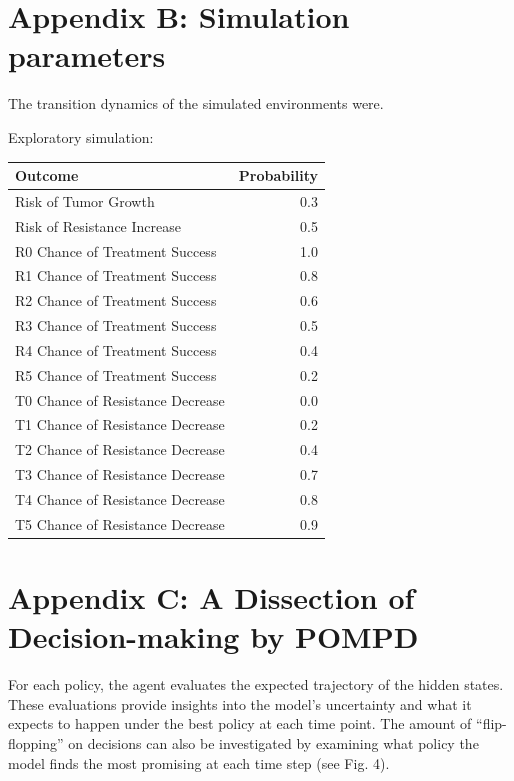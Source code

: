 \documentclass[
]{article}
\begin{document}
\section{Appendix B: Simulation
parameters}\label{appendix-b-simulation-parameters}

The transition dynamics of the simulated environments were.

Exploratory simulation:

\begin{longtable}[]{@{}lr@{}}
\toprule\noalign{}
Outcome & Probability \\
\midrule\noalign{}
\endhead
\bottomrule\noalign{}
\endlastfoot
Risk of Tumor Growth & 0.3 \\
Risk of Resistance Increase & 0.5 \\
R0 Chance of Treatment Success & 1.0 \\
R1 Chance of Treatment Success & 0.8 \\
R2 Chance of Treatment Success & 0.6 \\
R3 Chance of Treatment Success & 0.5 \\
R4 Chance of Treatment Success & 0.4 \\
R5 Chance of Treatment Success & 0.2 \\
T0 Chance of Resistance Decrease & 0.0 \\
T1 Chance of Resistance Decrease & 0.2 \\
T2 Chance of Resistance Decrease & 0.4 \\
T3 Chance of Resistance Decrease & 0.7 \\
T4 Chance of Resistance Decrease & 0.8 \\
T5 Chance of Resistance Decrease & 0.9 \\
\end{longtable}

\section{Appendix C: A Dissection of Decision-making by
POMPD}\label{appendix-c-a-dissection-of-decision-making-by-pompd}

For each policy, the agent evaluates the expected trajectory of the
hidden states. These evaluations provide insights into the model's
uncertainty and what it expects to happen under the best policy at each
time point. The amount of ``flip-flopping'' on decisions can also be
investigated by examining what policy the model finds the most promising
at each time step (see Fig. 4).
\end{document}
